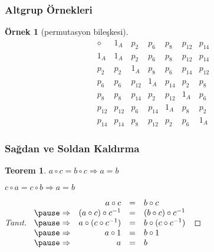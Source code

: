 \documentclass[dvipsnames]{beamer}
\theoremstyle{definition}
\theoremstyle{example}
\newtheorem{ornek}[theorem]{Örnek}
\theoremstyle{plain}
\newtheorem{teorem}[theorem]{Teorem}
\begin{document}
\begin{frame}
  \frametitle{Altgrup Örnekleri}

  \begin{ornek}[permutasyon bileşkesi]
    \[
      \begin{array}{c||c|c|c|c|c|c}
        \diamond & 1_{A}  & p_{2}  & p_{6}  & p_{8}  & p_{12} & p_{14}\\\hline\hline
        1_{A}    & 1_{A}  & p_{2}  & p_{6}  & p_{8}  & p_{12} & p_{14}\\\hline
        p_{2}    & p_{2}  & 1_{A}  & p_{8}  & p_{6}  & p_{14} & p_{12}\\\hline
        p_{6}    & p_{6}  & p_{12} & 1_{A}  & p_{14} & p_{2}  & p_{8}\\\hline
        p_{8}    & p_{8}  & p_{14} & p_{2}  & p_{12} & 1_{A}  & p_{6}\\\hline
        p_{12}   & p_{12} & p_{6}  & p_{14} & 1_{A}  & p_{8}  & p_{2}\\\hline
        p_{14}   & p_{14} & p_{8}  & p_{12} & p_{2}  & p_{6}  & 1_{A}
      \end{array}
    \]
  \end{ornek}
\end{frame}

\begin{frame}
  \frametitle{Sağdan ve Soldan Kaldırma}

  \begin{teorem}
    $a \circ c = b \circ c \Rightarrow a = b$

    $c \circ a = c \circ b \Rightarrow a = b$
  \end{teorem}

  \pause
  \begin{proof}[Tanıt]
    $\begin{array}{crcl}
                  & a \circ c                & = & b \circ c\\ \pause
      \Rightarrow & (a \circ c) \circ c^{-1} & = & (b \circ c) \circ c^{-1}\\ \pause
      \Rightarrow & a \circ (c \circ c^{-1}) & = & b \circ (c \circ c^{-1})\\ \pause
      \Rightarrow & a \circ 1                & = & b \circ 1\\ \pause
      \Rightarrow & a                        & = & b
    \end{array}$

  \end{proof}
\end{frame}
\end{document}
